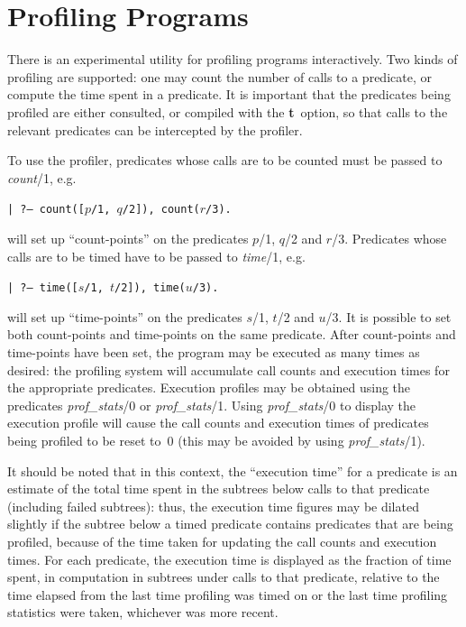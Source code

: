 \section{Profiling Programs}

There is an experimental utility for profiling programs interactively.
Two kinds of profiling are supported:
one may count the number of calls to a predicate,
or compute the time spent in a predicate.
It is important that the predicates being profiled are either consulted,
or compiled with the {\bf t}~option,
so that calls to the relevant predicates can be intercepted by the profiler.

To use the profiler, predicates whose calls are to be counted must be
passed to {\em count}/1, e.g.
\begin{center}
{\tt | ?-- count([$p$/1, $q$/2]), count($r$/3).}
\end{center}
will set up ``count-points'' on the predicates $p$/1, $q$/2 and $r$/3.
Predicates whose calls are to be timed have to be passed to {\em time}/1, e.g.
\begin{center}
{\tt | ?-- time([$s$/1, $t$/2]), time($u$/3).}
\end{center}
will set up ``time-points'' on the predicates $s$/1, $t$/2 and $u$/3.
It is possible to set both count-points and time-points on the same predicate.
After count-points and time-points have been set,
the program may be executed as many times as desired: the profiling system will
accumulate call counts and execution times for the appropriate predicates.
Execution profiles may be obtained using the
predicates {\em prof\_stats}/0 or {\em prof\_stats}/1.
Using {\em prof\_stats}/0 to display the execution profile will cause the call
counts and execution times of predicates being profiled to be reset to~0
(this may be avoided by using {\em prof\_stats}/1).

It should be noted that in this context, the ``execution time'' for a predicate
is an estimate of the total time spent in the subtrees below calls to that
predicate (including failed subtrees): thus, the execution time figures may
be dilated slightly if the subtree below a timed predicate contains
predicates that are being profiled, because of the time taken for updating
the call counts and execution times.
For each predicate, the execution
time is displayed as the fraction of time spent, in computation in subtrees
under calls to that predicate, relative to the time elapsed from the last
time profiling was timed on or the last time profiling statistics were
taken, whichever was more recent.

